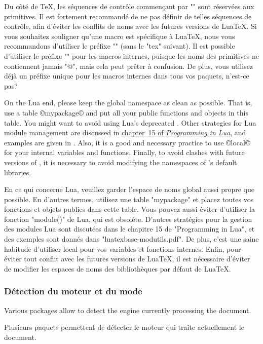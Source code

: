 \documentclass{lltxdoc}
\begin{document}
Du côté de TeX, les séquences de contrôle commençant par "\luatex" sont réservées aux primitives. Il est fortement recommandé de ne pas définir de telles séquences de contrôle, afin d'éviter les conflits de noms avec les futures versions de LuaTeX. Si vous souhaitez souligner qu'une macro est spécifique à LuaTeX, nous vous recommandons d'utiliser le préfixe "\lua" (sans le "tex" suivant). Il est possible d'utiliser le préfixe "\luatex@" pour les macros internes, puisque les noms des primitives ne contiennent jamais "@", mais cela peut prêter à confusion. De plus, vous utilisez déjà un préfixe unique pour les macros internes dans tous vos paquets, n'est-ce pas?

On the Lua end, please keep the global namespace as clean as possible. That
is, use a table ©mypackage© and put all your public functions and objects in
this table. You might want to avoid using Lua's deprecated .
Other strategies for Lua module management are discussed in
\href{http://www.lua.org/pil/15.html}{chapter~15 of \emph{Programming in
Lua}}, and examples are given in . Also, it
is a good and necessary practice to use ©local© for your internal variables and
functions. Finally, to avoid clashes with future versions of \luatex, it is
necessary to avoid modifying the namespaces of \luatex's default libraries.

En ce qui concerne Lua, veuillez garder l'espace de noms global aussi propre que possible. En d'autres termes, utilisez une table "mypackage" et placez toutes vos fonctions et objets publics dans cette table. Vous pouvez aussi éviter d'utiliser la fonction "module()" de Lua, qui est obsolète. D'autres stratégies pour la gestion des modules Lua sont discutées dans le chapitre 15 de "Programming in Lua", et des exemples sont donnés dans "luatexbase-modutils.pdf". De plus, c'est une saine habitude d'utiliser local pour vos variables et fonctions internes. Enfin, pour éviter tout conflit avec les futures versions de LuaTeX, il est nécessaire d'éviter de modifier les espaces de noms des bibliothèques par défaut de LuaTeX.

\subsubsection{Détection du moteur et du mode}\label{detect}

Various packages allow to detect the engine currently processing the document.

Plusieurs paquets permettent de détecter le moteur qui traite actuellement le document.
\end{document}
